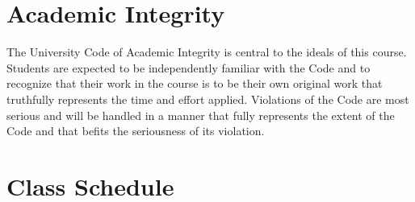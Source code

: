 \documentclass[letterpaper]{modular_syllabus} %
\begin{document}
\vspace{0.5cm}
\section{Academic Integrity}

The University Code of Academic Integrity is central to the ideals of this course. Students are expected to be independently familiar with the Code and to recognize that their work in the course is to be their own original work that truthfully represents the time and effort applied.  Violations of the Code are most serious and will be handled in a manner that fully represents the extent of the Code and that befits the seriousness of its violation.\\

\newpage
\makeFullPage
\section{Class Schedule}
\end{document}
